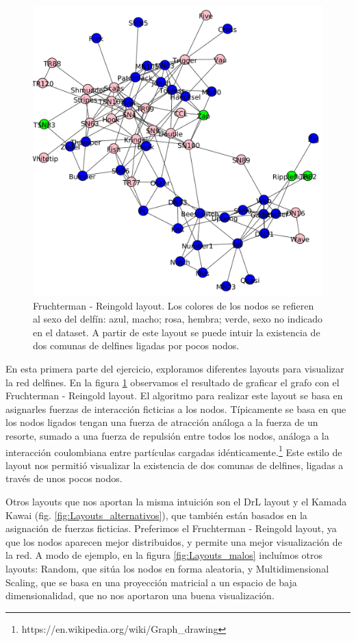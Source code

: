 \begin{figure}
\centering
\includegraphics[scale = 0.50]{figuras/FrutRein-eps-converted-to.pdf}
\caption{Fruchterman - Reingold layout. Los colores de los nodos se refieren al sexo del delfín: azul, macho; rosa, hembra; verde, sexo no indicado en el dataset. A partir de este layout se puede intuir la existencia de dos comunas de delfines ligadas por pocos nodos.}
\label{fig:Layout_delfines}
\end{figure}

\par En esta primera parte del ejercicio, exploramos diferentes layouts para visualizar la red delfines.
En la figura \ref{fig:Layout_delfines} observamos el resultado de graficar
el grafo con el Fruchterman - Reingold layout. El algoritmo para realizar este layout se basa en asignarles fuerzas de interacción ficticias a los nodos. Típicamente se basa en que los nodos ligados tengan una fuerza de atracción análoga a la fuerza de un resorte, sumado a una fuerza de repulsión entre todos los nodos, análoga a la interacción coulombiana entre partículas cargadas idénticamente.\footnote{https://en.wikipedia.org/wiki/Graph\_drawing}
Este estilo de layout nos permitió visualizar la existencia de dos comunas de delfines, ligadas a través de unos pocos nodos.
\par Otros layouts que nos aportan la misma intuición son el DrL layout y el Kamada Kawai (fig. \ref{fig:Layouts_alternativos}), que también están basados en la asignación de fuerzas ficticias. Preferimos el Fruchterman - Reingold layout, ya que los nodos aparecen mejor distribuidos, y permite una mejor visualización de la red.
A modo de ejemplo, en la figura \ref{fig:Layouts_malos} incluímos otros layouts: Random, que sitúa los nodos en forma aleatoria, y Multidimensional Scaling, que se basa en una proyección matricial a un espacio de baja dimensionalidad, que no nos aportaron una buena visualización.

